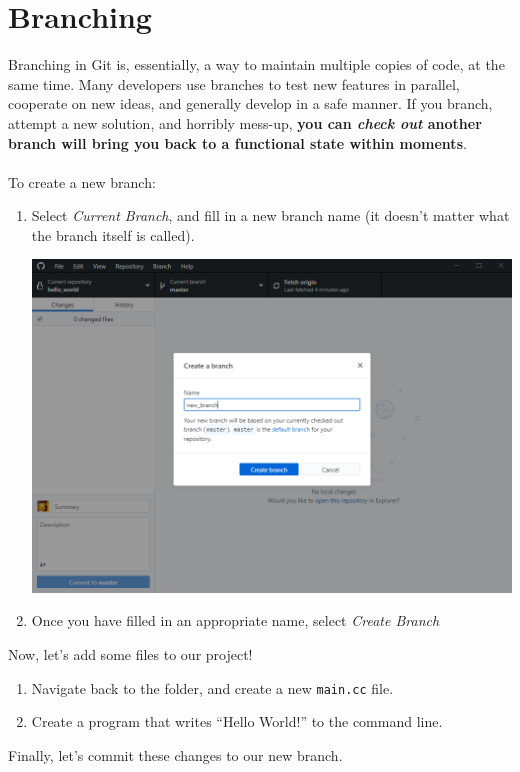 \documentclass[12pt, letter]{article}
\begin{document}
    \section{Branching}
    Branching in Git is, essentially, a way to maintain multiple copies of code, at the same time. Many developers use branches to test new features in parallel, cooperate on new ideas, and generally develop in a safe manner. If you branch, attempt a new solution, and horribly mess-up, \textbf{you can \emph{check out} another branch will bring you back to a functional state within moments}.
    \\ \\
    To create a new branch:
    \begin{enumerate}
        \item Select \emph{Current Branch}, and fill in a new branch name (it doesn't matter what the branch itself is called).

        \includegraphics{screenshots/shot7.bmp}

        \item Once you have filled in an appropriate name, select \emph{Create Branch}
    \end{enumerate}
    Now, let's add some files to our project!
    \begin{enumerate}
        \item Navigate back to the folder, and create a new \verb|main.cc| file.

        \item Create a program that writes ``Hello World!'' to the command line.
    \end{enumerate}
    Finally, let's commit these changes to our new branch.
\end{document}
